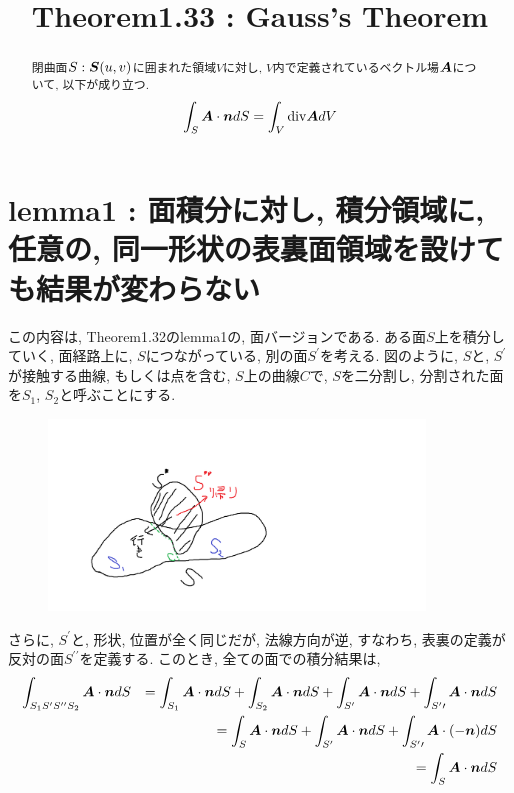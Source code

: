 \documentclass{jsarticle}
\title{Theorem1.33 : Gauss's Theorem}
\newcommand*{\mbold}[1]{\mbox{\boldmath $#1$}}
\newcommand*{\divg}{{\rm div}}
\begin{document}
\maketitle

\begin{abstract}
  閉曲面$S : \mbold{S}(u, v)$に囲まれた領域$V$に対し, $V$内で定義されているベクトル場$\mbold{A}$について, 以下が成り立つ. 
  \begin{eqnarray}
    \int_S \mbold{A}\cdot \mbold{n}dS = \int_V \divg \mbold{A}dV 
  \end{eqnarray}
\end{abstract}

\section{lemma1 : 面積分に対し, 積分領域に, 任意の, 同一形状の表裏面領域を設けても結果が変わらない}
この内容は, Theorem1.32のlemma1の, 面バージョンである. 
ある面$S$上を積分していく, 面経路上に, $S$につながっている, 別の面$S^\prime$を考える. 
図のように, $S$と, $S^\prime$が接触する曲線, もしくは点を含む, $S$上の曲線$C$で, $S$を二分割し, 分割された面を$S_1$, $S_2$と呼ぶことにする. 
\begin{figure}[htbp]
  \begin{center}
    \includegraphics[width=10cm]{Figure/SurfaceAdd.png}
  \end{center}
\end{figure}

さらに, $S^\prime$と, 形状, 位置が全く同じだが, 法線方向が逆, すなわち, 表裏の定義が反対の面$S^{\prime\prime}$を定義する. 
このとき, 全ての面での積分結果は, 
\begin{eqnarray}
  \int_{S_1 S^\prime S^{\prime\prime} S_2}\mbold{A}\cdot\mbold{n}dS 
  && = \int_{S_1}\mbold{A}\cdot\mbold{n}dS + \int_{S_2}\mbold{A}\cdot\mbold{n}dS 
  + \int_{S^\prime}\mbold{A}\cdot\mbold{n}dS + \int_{S^\prime\prime}\mbold{A}\cdot\mbold{n}dS \nonumber \\
  && = \int_{S}\mbold{A}\cdot\mbold{n}dS
  + \int_{S^\prime}\mbold{A}\cdot\mbold{n}dS + \int_{S^\prime\prime}\mbold{A}\cdot (-\mbold{n})dS \nonumber \\
  && = \int_{S}\mbold{A}\cdot\mbold{n}dS
\end{eqnarray}
\end{document}
